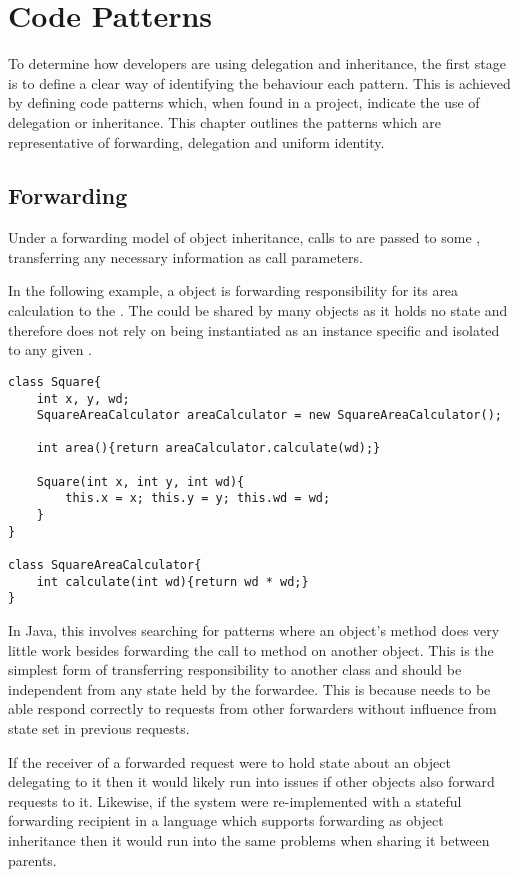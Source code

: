\chapter{Code Patterns}\label{C:bg}
To determine how developers are using delegation and inheritance, the first stage is to define a clear way of identifying the behaviour each pattern. This is achieved by defining code patterns which, when found in a project, indicate the use of delegation or inheritance. This chapter outlines the patterns which are representative of forwarding, delegation and uniform identity.

\section{Forwarding}
Under a forwarding model of object inheritance, calls to  are passed to some , transferring any necessary information as call parameters.
\newline

In the following example, a  object is forwarding responsibility for its area calculation to the . The  could be shared by many  objects as it holds no state and therefore does not rely on being instantiated as an instance specific and isolated to any given .

\begin{lstlisting}
class Square{
	int x, y, wd;
	SquareAreaCalculator areaCalculator = new SquareAreaCalculator();

	int area(){return areaCalculator.calculate(wd);}

	Square(int x, int y, int wd){
		this.x = x; this.y = y; this.wd = wd;
	}
}

class SquareAreaCalculator{
	int calculate(int wd){return wd * wd;}
}
\end{lstlisting}

In Java, this involves searching for patterns where an object's method does very little work besides forwarding the call to method on another object. This is the simplest form of transferring responsibility to another class and should be independent from any state held by the forwardee. This is because needs to be able respond correctly to requests from other forwarders without influence from state set in previous requests.

If the receiver of a forwarded request were to hold state about an object delegating to it then it would likely run into issues if other objects also forward requests to it. Likewise, if the system were re-implemented with a stateful forwarding recipient in a language which supports forwarding as object inheritance then it would run into the same problems when sharing it between parents.

